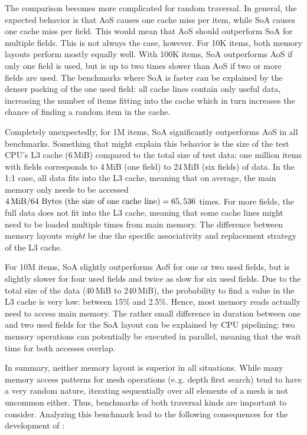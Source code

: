 The comparison becomes more complicated for random traversal.
In general, the expected behavior is that AoS causes one cache miss per item, while SoA causes one cache miss per field.
This would mean that AoS should outperform SoA for multiple fields.
This is not always the case, however.
For 10K items, both memory layouts perform mostly equally well.
With 100K items, SoA outperforms AoS if only one field is used, but is up to two times slower than AoS if two or more fields are used.
The benchmarks where SoA is faster can be explained by the denser packing of the one used field: all cache lines contain only useful data, increasing the number of items fitting into the cache which in turn increases the chance of finding a random item in the cache.

Completely unexpectedly, for 1M items, SoA significantly outperforms AoS in all benchmarks.
Something that might explain this behavior is the size of the test CPU's L3 cache (6\,MiB) compared to the total size of test data:
one million items with  fields corresponds to 4\,MiB (one field) to 24\,MiB (six fields) of data.
In the \textsf{1:1} case, all data fits into the L3 cache, meaning that on average, the main memory only needs to be accessed $4 \text{\,MiB} / 64 \text{ Bytes (the size of one cache line)} = 65,536$ times.
For more fields, the full data does not fit into the L3 cache, meaning that some cache lines might need to be loaded multiple times from main memory.
The difference between memory layouts \emph{might} be due the specific associativity and replacement strategy of the L3 cache.

For 10M items, SoA slightly outperforms AoS for one or two used fields, but is slightly slower for four used fields and twice as slow for six used fields.
Due to the total size of the data (40\,MiB to 240\,MiB), the probability to find a value in the L3 cache is very low: between 15\% and 2.5\%.
Hence, most memory reads actually need to access main memory.
The rather small difference in duration between one and two used fields for the SoA layout can be explained by CPU pipelining: two memory operations can potentially be executed in parallel, meaning that the wait time for both accesses overlap.

\vspace{1.5cm}

In summary, neither memory layout is superior in all situations.
While many memory access patterns for mesh operations (e.\,g. depth first search) tend to have a very random nature, iterating sequentially over all elements of a mesh is not uncommon either.
Thus, benchmarks of both traversal kinds are important to consider.
Analyzing this benchmark lead to the following consequences for the development of :

